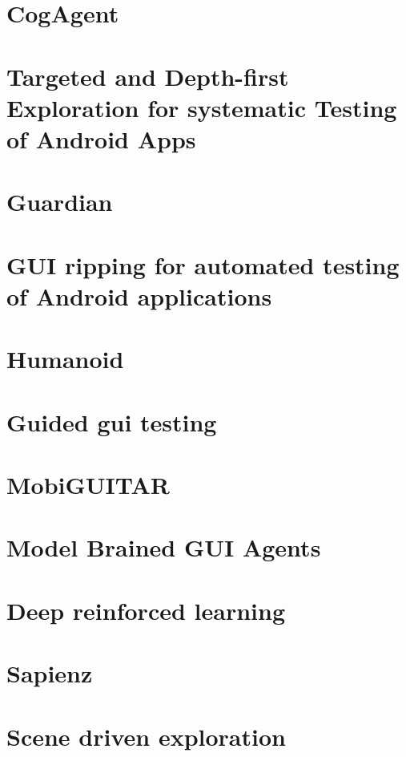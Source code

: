 \section{CogAgent}\label{cogagent}

\section{Targeted and Depth-first Exploration for systematic Testing of
Android
Apps}\label{targeted-and-depth-first-exploration-for-systematic-testing-of-android-apps}

\section{Guardian}\label{guardian}

\section{GUI ripping for automated testing of Android
applications}\label{gui-ripping-for-automated-testing-of-android-applications}

\section{Humanoid}\label{humanoid}

\section{Guided gui testing}\label{guided-gui-testing}

\section{MobiGUITAR}\label{mobiguitar}

\section{Model Brained GUI Agents}\label{model-brained-gui-agents}

\section{Deep reinforced learning}\label{deep-reinforced-learning}

\section{Sapienz}\label{sapienz}

\section{Scene driven exploration}\label{scene-driven-exploration}
